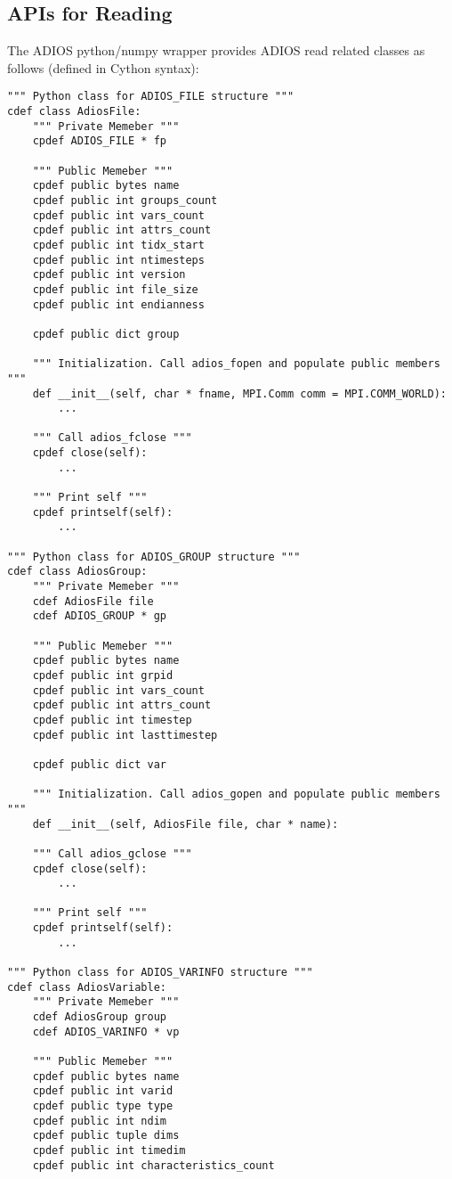 \subsection{APIs for Reading}
The ADIOS python/numpy wrapper provides ADIOS read related classes as follows (defined in Cython syntax):
\begin{lstlisting}[language=cython,frame=single, backgroundcolor=\color{gray85},caption={Write functions},label={},]
""" Python class for ADIOS_FILE structure """
cdef class AdiosFile:
    """ Private Memeber """
    cpdef ADIOS_FILE * fp

    """ Public Memeber """
    cpdef public bytes name
    cpdef public int groups_count
    cpdef public int vars_count
    cpdef public int attrs_count
    cpdef public int tidx_start
    cpdef public int ntimesteps
    cpdef public int version
    cpdef public int file_size
    cpdef public int endianness
    
    cpdef public dict group
    
    """ Initialization. Call adios_fopen and populate public members """
    def __init__(self, char * fname, MPI.Comm comm = MPI.COMM_WORLD):
        ...
    
    """ Call adios_fclose """
    cpdef close(self):
        ...
        
    """ Print self """
    cpdef printself(self):
        ...

""" Python class for ADIOS_GROUP structure """
cdef class AdiosGroup:
    """ Private Memeber """
    cdef AdiosFile file
    cdef ADIOS_GROUP * gp

    """ Public Memeber """
    cpdef public bytes name
    cpdef public int grpid
    cpdef public int vars_count
    cpdef public int attrs_count
    cpdef public int timestep
    cpdef public int lasttimestep
    
    cpdef public dict var
    
    """ Initialization. Call adios_gopen and populate public members """
    def __init__(self, AdiosFile file, char * name):

    """ Call adios_gclose """
    cpdef close(self):
        ...
        
    """ Print self """
    cpdef printself(self):
        ...

""" Python class for ADIOS_VARINFO structure """
cdef class AdiosVariable:
    """ Private Memeber """
    cdef AdiosGroup group
    cdef ADIOS_VARINFO * vp

    """ Public Memeber """
    cpdef public bytes name
    cpdef public int varid
    cpdef public type type
    cpdef public int ndim
    cpdef public tuple dims
    cpdef public int timedim
    cpdef public int characteristics_count
    

\end{lstlisting}
